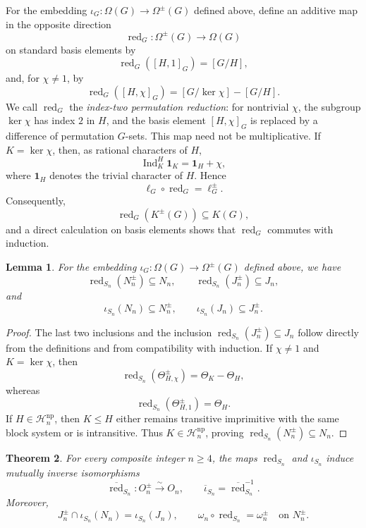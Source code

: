\documentclass[a4paper,11pt]{article}
\numberwithin{equation}{section}
\newtheorem{theorem}{Theorem}[section]
\newtheorem{lemma}[theorem]{Lemma}
\newcommand{\Ind}{\operatorname{Ind}}
\newcommand{\red}{\operatorname{red}}
\newcommand{\one}{\mathbf{1}}
\begin{document}
For the embedding $\iota_G:\Omega(G)\to\Omega^{\pm}(G)$ defined above,
define an additive map in the opposite direction
\begin{equation}\label{eq:red-map}
  \red_G:\Omega^{\pm}(G)\longrightarrow\Omega(G)
\end{equation}
on standard basis elements by
\[
  \red_G([H,1]_G)=[G/H],
\]
and, for $\chi\ne1$, by
\[
  \red_G([H,\chi]_G)
  =
  [G/\ker\chi]-[G/H].
\]
We call $\red_G$ the \emph{index-two permutation reduction}: for nontrivial
$\chi$, the subgroup $\ker\chi$ has index $2$ in $H$, and the basis element
$[H,\chi]_G$ is replaced by a difference of permutation $G$-sets. This map
need not be multiplicative. If $K=\ker\chi$, then, as rational characters of
$H$,
\[
  \Ind_K^H\one_K=\one_H+\chi,
\]
where $\one_H$ denotes the trivial character of $H$. Hence
\[
  \ell_G\circ\red_G=\ell_G^{\pm}.
\]
Consequently,
\[
  \red_G(K^{\pm}(G))\subseteq K(G),
\]
and a direct calculation on basis elements shows that $\red_G$ commutes with
induction.

\begin{lemma}\label{lem:red-preserves-lattices}
For the embedding $\iota_G:\Omega(G)\to\Omega^{\pm}(G)$ defined above, we
have
\[
  \red_{S_n}(N_n^{\pm})\subseteq N_n,
  \qquad
  \red_{S_n}(J_n^{\pm})\subseteq J_n,
\]
and
\[
  \iota_{S_n}(N_n)\subseteq N_n^{\pm},
  \qquad
  \iota_{S_n}(J_n)\subseteq J_n^{\pm}.
\]
\end{lemma}

\begin{proof}
The last two inclusions and the inclusion
$\red_{S_n}(J_n^{\pm})\subseteq J_n$ follow directly from the definitions and
from compatibility with induction. If $\chi\ne1$ and $K=\ker\chi$, then
\[
  \red_{S_n}(\Theta_{H,\chi}^{\pm})
  =
  \Theta_K-\Theta_H,
\]
whereas
\[
  \red_{S_n}(\Theta_{H,1}^{\pm})=\Theta_H.
\]
If $H\in\mathcal H_n^{\mathrm{np}}$, then $K\le H$ either remains
transitive imprimitive with the same block system or is intransitive. Thus
$K\in\mathcal H_n^{\mathrm{np}}$, proving
$\red_{S_n}(N_n^{\pm})\subseteq N_n$.
\end{proof}

\begin{theorem}
\label{thm:monomial-ordinary}
For every composite integer $n\ge4$, the maps $\red_{S_n}$ and $\iota_{S_n}$
induce mutually inverse isomorphisms
\[
  \overline{\red}_{S_n}:O_n^{\pm}\xrightarrow{\sim}O_n,
  \qquad
  \overline{\iota}_{S_n}=\overline{\red}_{S_n}^{-1}.
\]
Moreover,
\[
  J_n^{\pm}\cap\iota_{S_n}(N_n)=\iota_{S_n}(J_n),
  \qquad
  \omega_n\circ\red_{S_n}=\omega_n^{\pm}
  \quad\text{on }N_n^{\pm}.
\]
\end{theorem}
\end{document}
